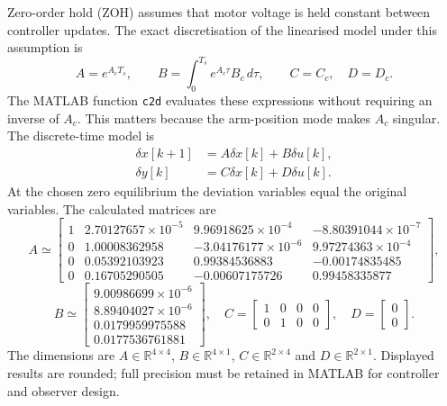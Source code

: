 \documentclass[11pt,a4paper]{article}
\begin{document}
Zero-order hold (ZOH) assumes that motor voltage is held constant between
controller updates. The exact discretisation of the linearised model
under this assumption is
\begin{equation}\label{eq:zoh}
A=e^{A_cT_s},\qquad
B=\int_0^{T_s}e^{A_c\tau}B_c\,d\tau,\qquad C=C_c,\quad D=D_c.
\end{equation}
The MATLAB function \texttt{c2d} evaluates these expressions without
requiring an inverse of $A_c$. This matters because the arm-position mode
makes $A_c$ singular.
The discrete-time model is
\begin{subequations}\label{eq:dt_ss}
\begin{align}
\delta x[k+1]&=A\delta x[k]+B\delta u[k],\\
\delta y[k]&=C\delta x[k]+D\delta u[k].
\end{align}
\end{subequations}
At the chosen zero equilibrium the deviation variables equal the
original variables. The calculated matrices are
\begin{equation}\label{eq:A_discrete}
A\simeq
\begin{bmatrix}
1&2.70127657\!\times\!10^{-5}&9.96918625\!\times\!10^{-4}&-8.80391044\!\times\!10^{-7}\\
0&1.00008362958&-3.04176177\!\times\!10^{-6}&9.97274363\!\times\!10^{-4}\\
0&0.05392103923&0.99384536883&-0.00174835485\\
0&0.16705290505&-0.00607175726&0.99458335877
\end{bmatrix},
\end{equation}
\begin{equation}
B\simeq\begin{bmatrix}
9.00986699\times10^{-6}\\8.89404027\times10^{-6}\\
0.0179959975588\\0.0177536761881
\end{bmatrix},\quad
C=\begin{bmatrix}1&0&0&0\\0&1&0&0\end{bmatrix},\quad
D=\begin{bmatrix}0\\0\end{bmatrix}.
\end{equation}
The dimensions are $A\in\mathbb R^{4\times4}$,
$B\in\mathbb R^{4\times1}$, $C\in\mathbb R^{2\times4}$ and
$D\in\mathbb R^{2\times1}$. Displayed results are rounded;
full precision must be retained in MATLAB for controller and observer
design.
\end{document}
